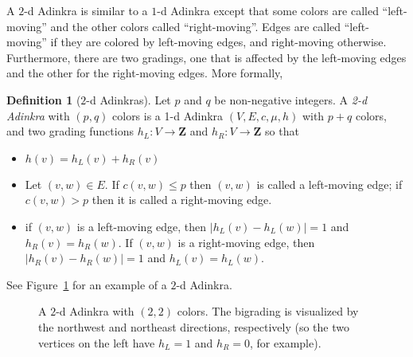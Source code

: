 \documentclass[12pt,twoside,singlespace]{article}
\numberwithin{equation}{section}
\theoremstyle{definition}
\newtheorem{definition}[equation]{Definition}
\newcommand{\ZZ}{\mathbf{Z}}
\begin{document}
A $2$-d Adinkra is similar to a $1$-d Adinkra except that some colors are called ``left-moving'' and the other colors called ``right-moving''.  Edges are called ``left-moving'' if they are colored by left-moving edges, and right-moving otherwise.  Furthermore, there are two gradings, one that is affected by the left-moving edges and the other for the right-moving edges. More formally,
\begin{definition}[$2$-d Adinkras]
Let $p$ and $q$ be non-negative integers. A \emph{2-d Adinkra} with $(p,q)$ colors is a 1-d Adinkra $(V,E,c,\mu,h)$ with $p+q$ colors, and two grading functions $h_L:V\to \ZZ$ and $h_R:V\to \ZZ$ so that
\begin{itemize}
\item $h(v)=h_L(v)+h_R(v)$
\item Let $(v,w)\in E$.  If $c(v,w)\le p$ then $(v,w)$ is called a left-moving edge; if $c(v,w)>p$ then it is called a right-moving edge.
\item if $(v,w)$ is a left-moving edge, then $|h_L(v)-h_L(w)|=1$ and $h_R(v)=h_R(w)$.  If $(v,w)$ is a right-moving edge, then $|h_R(v)-h_R(w)|=1$ and $h_L(v)=h_L(w)$.
\end{itemize}

See Figure~\ref{fig:2d-example} for an example of a $2$-d Adinkra.
\end{definition}

\begin{figure}[htb]
\begin{center}

\caption{A $2$-d Adinkra with $(2,2)$ colors. The bigrading is visualized by the northwest and northeast directions, respectively (so the two vertices on the left have $h_L = 1$ and $h_R = 0$, for example). \label{fig:2d-example}}
\end{center}
\end{figure}
\end{document}
